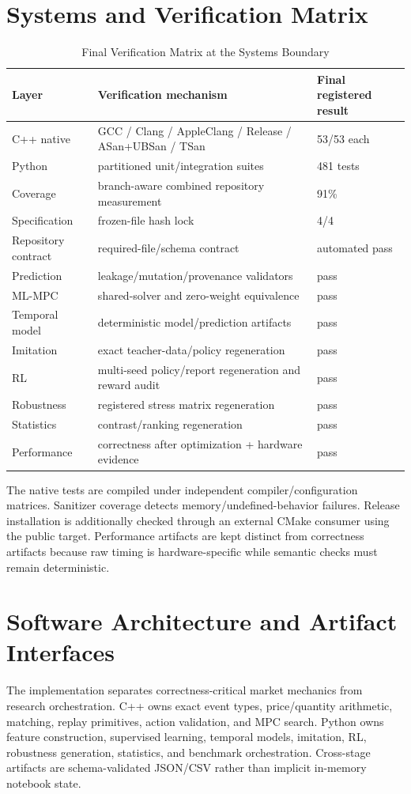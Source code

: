 \documentclass[journal,10pt]{IEEEtran}
\newcommand{\1}{\mathbf{1}}
\begin{document}
\section{Systems and Verification Matrix}
\begin{table}[t]
\centering
\caption{Final Verification Matrix at the Systems Boundary}
\label{tab:verification}
\begin{tabular}{lll}
\toprule
Layer & Verification mechanism & Final registered result \\
\midrule
C++ native & GCC / Clang / AppleClang / Release / ASan+UBSan / TSan & 53/53 each \\
Python & partitioned unit/integration suites & 481 tests \\
Coverage & branch-aware combined repository measurement & 91\% \\
Specification & frozen-file hash lock & 4/4 \\
Repository contract & required-file/schema contract & automated pass \\
Prediction & leakage/mutation/provenance validators & pass \\
ML-MPC & shared-solver and zero-weight equivalence & pass \\
Temporal model & deterministic model/prediction artifacts & pass \\
Imitation & exact teacher-data/policy regeneration & pass \\
RL & multi-seed policy/report regeneration and reward audit & pass \\
Robustness & registered stress matrix regeneration & pass \\
Statistics & contrast/ranking regeneration & pass \\
Performance & correctness after optimization + hardware evidence & pass \\
\bottomrule
\end{tabular}
\end{table}

The native tests are compiled under independent compiler/configuration matrices. Sanitizer coverage detects memory/undefined-behavior failures. Release installation is additionally checked through an external CMake consumer using the public target. Performance artifacts are kept distinct from correctness artifacts because raw timing is hardware-specific while semantic checks must remain deterministic.

\section{Software Architecture and Artifact Interfaces}
The implementation separates correctness-critical market mechanics from research orchestration. C++ owns exact event types, price/quantity arithmetic, matching, replay primitives, action validation, and MPC search. Python owns feature construction, supervised learning, temporal models, imitation, RL, robustness generation, statistics, and benchmark orchestration. Cross-stage artifacts are schema-validated JSON/CSV rather than implicit in-memory notebook state.
\end{document}
